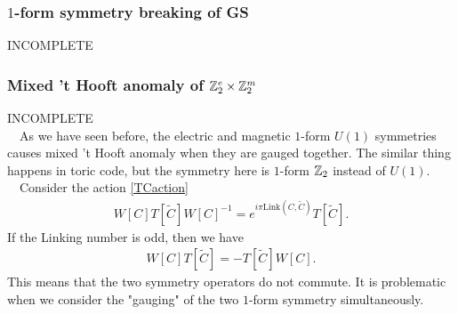 \documentclass{ltjsarticle}
\theoremstyle{mystyle} %
\numberwithin{equation}{section}
\begin{document}
\subsubsection{$1$-form symmetry breaking of GS}
INCOMPLETE\\
\subsubsection{Mixed 't Hooft anomaly of $\mathbb{Z}_2^e\times \mathbb{Z}_2^m$}
\color{red}
INCOMPLETE\\
\color{black}
　As we have seen before, the electric and magnetic $1$-form $U(1)$ symmetries causes
mixed 't Hooft anomaly when they are gauged together. 
The similar thing happens in toric code, but the symmetry here is $1$-form $\mathbb{Z}_2$ instead of $U(1)$. \\
　Consider the action \eqref{TCaction}
\begin{align}
    \label{TCaction}
    W[C] T[\tilde{C}] W[C]^{-1} = e^{i\pi \mathrm{Link}(C, \tilde{C})}T[\tilde{C}].  
\end{align}
If the Linking number is odd, then we have
\begin{align}
    W[C] T[\tilde{C}] = -T[\tilde{C}]W[C]. 
\end{align}
This means that the two symmetry operators do not commute. 
It is problematic when we consider the "gauging" of the two $1$-form symmetry simultaneously. 
\end{document}
